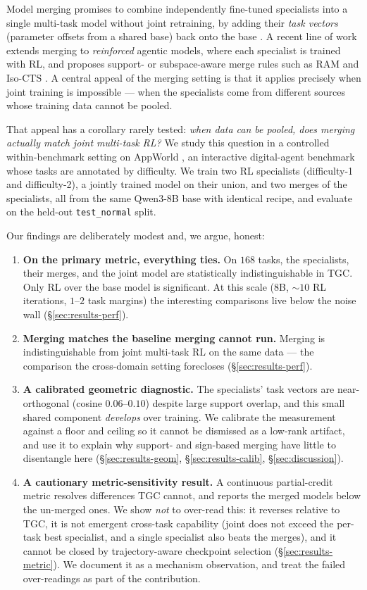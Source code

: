 \documentclass[11pt]{article}
\begin{document}
Model merging promises to combine independently fine-tuned specialists into a single
multi-task model without joint retraining, by adding their \emph{task vectors}
(parameter offsets from a shared base) back onto the base
\citep{ilharco2023taskarithmetic}. A recent line of work extends merging to
\emph{reinforced} agentic models, where each specialist is trained with RL, and
proposes support- or subspace-aware merge rules such as RAM \citep{ram2026} and Iso-CTS
\citep{isocts2025}. A central appeal of the
merging setting is that it applies precisely when joint training is impossible --- when
the specialists come from different sources whose training data cannot be pooled.

That appeal has a corollary rarely tested: \emph{when data can be pooled, does merging
actually match joint multi-task RL?} We study this question in a controlled
within-benchmark setting on AppWorld \citep{trivedi2024appworld}, an interactive
digital-agent benchmark whose tasks are annotated by difficulty. We train two RL
specialists (difficulty-1 and difficulty-2), a jointly trained model on their union,
and two merges of the specialists, all from the same Qwen3-8B base with identical
recipe, and evaluate on the held-out \texttt{test\_normal} split.

Our findings are deliberately modest and, we argue, honest:
\begin{enumerate}
\item \textbf{On the primary metric, everything ties.} On $168$ tasks, the specialists,
their merges, and the joint model are statistically indistinguishable in TGC. Only RL
over the base model is significant. At this scale ($8$B, $\sim\!10$ RL iterations,
$1$--$2$ task margins) the interesting comparisons live below the noise wall
(\S\ref{sec:results-perf}).
\item \textbf{Merging matches the baseline merging cannot run.} Merging is
indistinguishable from joint multi-task RL on the same data --- the comparison the
cross-domain setting forecloses (\S\ref{sec:results-perf}).
\item \textbf{A calibrated geometric diagnostic.} The specialists' task vectors are
near-orthogonal (cosine $0.06$--$0.10$) despite large support overlap, and this small
shared component \emph{develops} over training. We calibrate the measurement against a
floor and ceiling so it cannot be dismissed as a low-rank artifact, and use it to
explain why support- and sign-based merging have little to disentangle here
(\S\ref{sec:results-geom}, \S\ref{sec:results-calib}, \S\ref{sec:discussion}).
\item \textbf{A cautionary metric-sensitivity result.} A continuous partial-credit
metric resolves differences TGC cannot, and reports the merged models below the
un-merged ones. We show \emph{not} to over-read this: it reverses relative to TGC, it is
not emergent cross-task capability (joint does not exceed the per-task best specialist,
and a single specialist also beats the merges), and it cannot be closed by
trajectory-aware checkpoint selection (\S\ref{sec:results-metric}). We document it as a
mechanism observation, and treat the failed over-readings as part of the contribution.
\end{enumerate}
\end{document}
